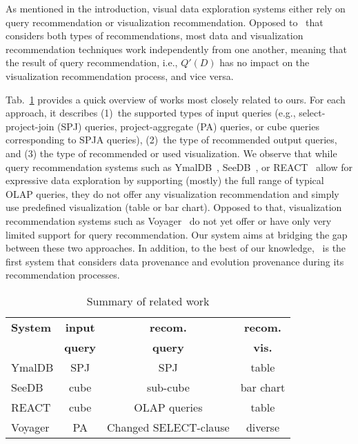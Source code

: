 \label{sec:related}



As mentioned in the introduction, visual data exploration systems either rely on query recommendation or visualization recommendation. Opposed to \prototype\ that considers both types of recommendations, most data and visualization recommendation techniques work independently from one another, meaning that the result of query recommendation, i.e., $Q'(D)$ has no impact on the visualization recommendation process, and vice versa. 

Tab.~\ref{tab:rw} provides a quick overview of works most closely related to ours. For each approach, it describes (1)~the supported types of input queries (e.g., select-project-join (SPJ) queries, project-aggregate (PA) queries, or cube queries corresponding to SPJA queries), (2)~the type of recommended output queries, and (3)  the type of recommended or used visualization. We observe that while query recommendation systems such as YmalDB~\cite{Drosou2013}, SeeDB~\cite{Vartak}, or REACT~\cite{Milo:2016} allow for expressive data exploration by supporting (mostly) the full range of typical OLAP queries, they do not offer any visualization recommendation and simply use predefined visualization (table or bar chart). Opposed to that, visualization recommendation systems such as Voyager~\cite{Wongsuphasawat2016} do not yet offer or have only very limited support for query recommendation. Our system aims at bridging the gap between these two approaches. In addition, to the best of our knowledge, \prototype\ is the first system that considers data provenance and evolution provenance during its recommendation processes. 

    \begin{table}[t]
 \centering \scriptsize
 \begin{tabular}{|@{}p{3.8cm}@{}|@{}c@{}|@{}c@{}|@{}c@{}|} \hline
 \textbf{System} & \textbf{input } & \textbf{recom. } &  \textbf{recom.} \\ 
  & \textbf{ query} & \textbf{query} &  \textbf{vis.} \\ 
 \hline
  YmalDB \cite{Drosou2013} & SPJ & SPJ &   table  \\ \hline
 SeeDB \cite{Vartak} & cube & sub-cube & bar chart  \\ \hline
 REACT \cite{Milo:2016} & cube & OLAP queries & table   \\ \hline
 Voyager \cite{Wongsuphasawat2016} &PA & Changed SELECT-clause &  diverse  \\ \hline

\end{tabular}
 \caption{Summary of related work}
 \vspace{-0.4cm}
 \label{tab:rw}
 \end{table}